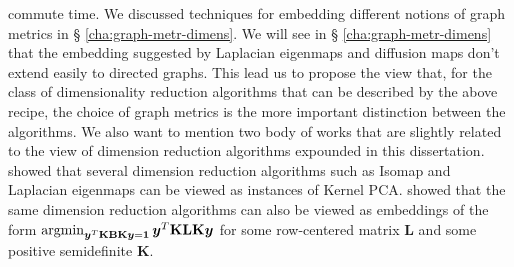 commute time. We discussed techniques for
embedding different notions of graph metrics in \S
\ref{cha:graph-metr-dimens}. We will see in \S
\ref{cha:graph-metr-dimens} that the embedding suggested by
Laplacian eigenmaps and diffusion maps don't extend easily to
directed graphs. This lead us to propose the view that, for the class of
dimensionality reduction algorithms that can be described by the above
recipe, the choice of graph metrics is the more important distinction
between the algorithms. We also want to mention two body of works that
are slightly related to the view of dimension reduction algorithms
expounded in this dissertation. \citet{ham04} showed that several
dimension reduction algorithms such as Isomap and Laplacian eigenmaps
can be viewed as instances of Kernel
PCA. \citet{yan07:_graph_embed_exten} showed that the same dimension
reduction algorithms can also be viewed as embeddings of the form
$\argmin_{\bm{y}^{T} \mathbf{K}\mathbf{B} \mathbf{K} \bm{y} = \bm{1}}
\bm{y}^{T} \mathbf{K} \mathbf{L} \mathbf{K} \bm{y}$ for some
row-centered matrix $\mathbf{L}$ and some positive semidefinite
$\mathbf{K}$.  
%  
%
%
%

